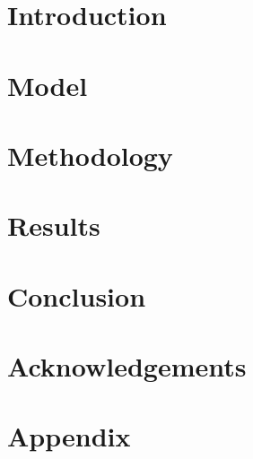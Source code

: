 \documentclass[
    reprint,
    amsmath,amssymb,
    prb,
    floatfix,
]{revtex4-2}
\begin{document}
\author{John Truong}
\author{Xuedong Hu}%

\date{\today}

\begin{abstract}
    \lipsum[1]
\end{abstract}

\maketitle

\section{Introduction}
    \lipsum[2-4]
\section{Model}
    \lipsum[5-7]
\section{Methodology}
    \lipsum[8-12]
\section{Results}
    \lipsum[13-15]
\section{Conclusion}
    \lipsum[16-17]
\section*{Acknowledgements}
    \lipsum[18]

\newpage
\appendix

\section{Appendix}
    \lipsum[19-20]
\end{document}
